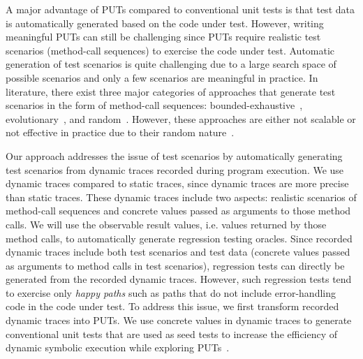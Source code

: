 A major advantage of PUTs compared to conventional unit tests is that test data is automatically generated based on the code under test. However, writing meaningful PUTs
can still be challenging since PUTs require realistic test scenarios (method-call sequences) to exercise the code under test. Automatic generation of test scenarios is quite challenging due to a large search space of possible scenarios and only a few scenarios are meaningful in practice. In literature, there exist three major categories of approaches that generate test scenarios in the form of method-call sequences: bounded-exhaustive~\cite{khurshid:symbolic, xie:rostra}, evolutionary~\cite{inkumsah08:improving, tonella:etoc}, and random~\cite{csallner:jcrasher, JTEST, pacheco:feedback}. However, these approaches are either not scalable or not effective in practice due to their random nature~\cite{thummalapenta09:mseqgen}. 

Our approach addresses the issue of test scenarios by automatically generating test scenarios from dynamic traces recorded during program execution. We use dynamic traces compared to static traces, since dynamic traces are more precise than static traces. These dynamic traces include two aspects: realistic scenarios of method-call sequences and concrete values passed as arguments to those method calls. We will use the observable result values, i.e. values returned by those method calls, to automatically generate regression testing oracles. Since recorded dynamic traces include both test scenarios and test data (concrete values passed as arguments to method calls in test scenarios), regression tests can directly be generated from the recorded dynamic traces. However, such regression tests tend to exercise only \emph{happy paths} such as paths that do not include error-handling code in the code under test. To address this issue, we first transform recorded dynamic traces into PUTs. We use concrete values in dynamic traces to generate conventional unit tests that are used as seed tests to increase the efficiency of dynamic symbolic execution while exploring PUTs~\cite{patrice08:whitebox}.

